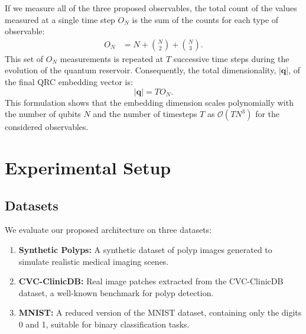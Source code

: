 \documentclass[conference]{IEEEtran}
\begin{document}
If we measure all of the three proposed observables, the total count of the values measured at a single time step $O_N$ is the sum of the counts for each type of observable:
\begin{equation}
    \begin{aligned}
    O_N &= N + \binom{N}{2} + \binom{N}{3}.
    \end{aligned}
    \label{eq:embeddings_per_timestep}
\end{equation}
This set of $O_N$ measurements is repeated at $T$ successive time steps during the evolution of the quantum reservoir. Consequently, the total dimensionality, $\lvert \bm q \rvert$, of the final QRC embedding vector is:
\begin{equation}
    \lvert \bm q \rvert = T O_N.
    \label{eq:total_embedding_dimension}
\end{equation}
This formulation shows that the embedding dimension scales polynomially with the number of qubits $N$ and the number of timesteps $T$ as $\mathcal{O}(TN^3)$ for the considered observables.


\section{Experimental Setup}
\subsection{Datasets}
We evaluate our proposed architecture on three datasets:
\begin{enumerate}
    \item \textbf{Synthetic Polyps:} 
    A synthetic dataset of polyp images generated to simulate 
    realistic medical imaging scenes.
    
    \item \textbf{CVC-ClinicDB:} 
    Real image patches extracted from the CVC-ClinicDB 
    dataset, a well-known benchmark for polyp detection. 
    
    \item \textbf{MNIST:} 
    A reduced version of the MNIST dataset, 
    containing only the digits 0 and 1, suitable 
    for binary classification tasks.
\end{enumerate}
\end{document}
